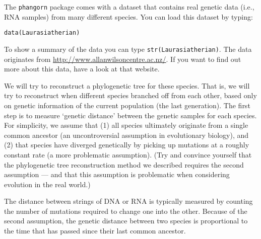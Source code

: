 \documentclass[a4paper, 9pt]{article}
\begin{document}
The \texttt{phangorn} package comes with a dataset that contains real
genetic data (i.e., RNA samples) from many different species. You can
load this dataset by typing:
\begin{lstlisting}
data(Laurasiatherian)
\end{lstlisting}
To show a summary of the data you can type
\texttt{str(Laurasiatherian)}. The data originates from
\url{http://www.allanwilsoncentre.ac.nz/}. If you want to find out more
about this data, have a look at that website.

We will try to reconstruct a phylogenetic tree for these species. That
is, we will try to reconstruct when different species branched off from
each other, based only on genetic information of the current population
(the last generation). The first step is to measure `genetic distance'
between the genetic samples for each species. For simplicity, we assume
that (1) all species ultimately originate from a single common ancestor (an
uncontroversial assumption in evolutionary biology), and (2) that species
have diverged genetically by picking up mutations at a roughly constant
rate (a more problematic assumption). 
(Try and convince yourself that the phylogenetic tree reconstruction method we described requires the second assumption --- and that this assumption is problematic when considering evolution in the real world.)

The distance between strings of DNA or RNA is typically measured by
counting the number of mutations required to change one into the other.
Because of the second assumption, the genetic distance between two
species is proportional to the time that has passed since their last
common ancestor.
\end{document}
